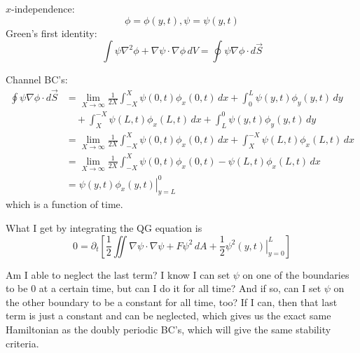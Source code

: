 \documentclass[12pt]{article}
\begin{document}
$x$-independence:
$$
\phi = \phi(y, t), \psi = \psi(y, t)
$$
Green's first identity:
$$
\int \psi \nabla^2 \phi + \nabla \psi \cdot \nabla \phi \, dV = \oint \psi \nabla \phi \cdot d \vec S
$$

Channel BC's:
\begin{align*}
\oint \psi \nabla \phi \cdot d \vec S &= \lim_{X \rightarrow \infty} \frac{1}{2X} \int_{-X}^X \psi(0,t) \phi_x(0,t) \, dx + \int_0^L \psi(y,t) \phi_y(y,t) \, dy  \\
 &\quad + \int_X^{-X} \psi(L,t) \phi_x(L,t) \, dx + \int_L^0 \psi(y,t) \phi_y(y,t) \, dy \\
 &= \lim_{X \rightarrow \infty} \frac{1}{2X} \int_{-X}^X \psi(0,t) \phi_x(0,t) \, dx + \int_X^{-X} \psi(L,t) \phi_x(L,t) \, dx \\
 &= \lim_{X \rightarrow \infty} \frac{1}{2X} \int_{-X}^X \psi(0,t) \phi_x(0,t) - \psi(L,t) \phi_x(L,t) \, dx \\
 &= \left. \psi(y,t) \phi_x(y,t) \right|_{y=L}^0
\end{align*}
which is a function of time.

What I get by integrating the QG equation is 
$$
0= \partial_t \left[ \frac12 \iint \nabla\psi\cdot\nabla\psi + F\psi^2 \, dA + \frac12 \left. \psi^2(y,t) \right|_{y=0}^L \right]
$$

Am I able to neglect the last term? I know I can set $\psi$ on one of the boundaries to be 0 at a certain time, but can I do it for all time? And if so, can I set $\psi$ on the other boundary to be a constant for all time, too? If I can, then that last term is just a constant and can be neglected, which gives us the exact same Hamiltonian as the doubly periodic BC's, which will give the same stability criteria.
\end{document}
